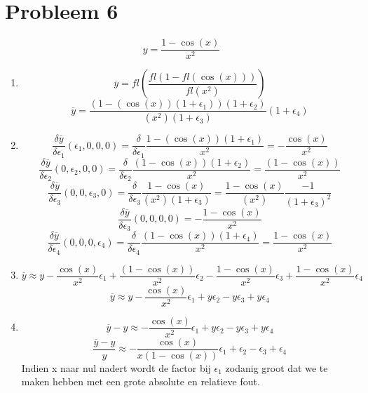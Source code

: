 \documentclass[12pt,a4paper]{article}
\begin{document}
\section{Probleem 6}

\[
y = \frac{1-\cos(x)}{x^2}
\]
\begin{enumerate}
\item
\[
\overline{y} = fl\left(\frac{fl(1-fl(\cos(x)))}{fl(x^2)}\right)
\]
\[
\overline{y} = \frac{(1-(\cos(x))(1+\epsilon_1))(1+\epsilon_2)}{(x^2)(1+\epsilon_3)}(1+\epsilon_4)
\]

\item
\[
\frac{\delta \overline{y}}{\delta \epsilon_1}(\epsilon_1,0,0,0)
= \frac{\delta}{\delta \epsilon_1}\frac{1-(\cos(x))(1+\epsilon_1)}{x^2} 
= -\frac{\cos(x)}{x^2}
\]
\[
\frac{\delta \overline{y}}{\delta \epsilon_2}(0,\epsilon_2,0,0)
= \frac{\delta}{\delta \epsilon_2}\frac{(1-\cos(x))(1+\epsilon_2)}{x^2}
= \frac{(1-\cos(x))}{x^2}
\]
\[
\frac{\delta \overline{y}}{\delta \epsilon_3}(0,0,\epsilon_3,0)
= \frac{\delta}{\delta \epsilon_3}\frac{1-\cos(x)}{(x^2)(1+\epsilon_3)} = \frac{1-\cos(x)}{(x^2)}\frac{-1}{(1+\epsilon_3)^2}
\]
\[
\frac{\delta \overline{y}}{\delta \epsilon_3}(0,0,0,0) = -\frac{1-\cos(x)}{x^2}
\]
\[
\frac{\delta \overline{y}}{\delta \epsilon_4}(0,0,0,\epsilon_4)
= \frac{\delta}{\delta \epsilon_4}\frac{(1-\cos(x))(1+\epsilon_4)}{x^2}
= \frac{1 - \cos(x)}{x^2}
\]

\item
\[
\overline{y} \approx y -\frac{\cos(x)}{x^2}\epsilon_1
+ \frac{(1-\cos(x))}{x^2}\epsilon_2
- \frac{1-\cos(x)}{x^2}\epsilon_3
+ \frac{1 - \cos(x)}{x^2}\epsilon_4
\]
\[
\overline{y} \approx y - \frac{\cos(x)}{x^2}\epsilon_1 + y\epsilon_2 - y\epsilon_3 + y\epsilon_4
\]
\item
\[
\overline{y}-y \approx - \frac{\cos(x)}{x^2}\epsilon_1 + y\epsilon_2 - y\epsilon_3 + y\epsilon_4
\]
\[
\frac{\overline{y}-y}{y} \approx - \frac{\cos(x)}{x(1-\cos(x))}\epsilon_1 + \epsilon_2 - \epsilon_3 + \epsilon_4
\]
Indien x naar nul nadert wordt de factor bij $\epsilon_1$ zodanig groot dat we te maken hebben met een grote absolute en relatieve fout.
\end{enumerate}
\end{document}
